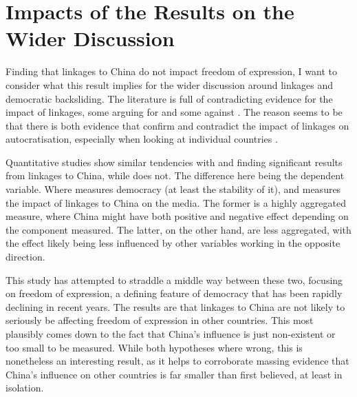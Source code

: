 \section{Impacts of the Results on the Wider Discussion}
Finding that linkages to China do not impact freedom of expression, I want to consider what this result implies for the wider discussion around linkages and democratic backsliding. The literature is full of contradicting evidence for the impact of linkages, some arguing for \citep{gamso_is_2021, loughlin_chinese_2021, toettoe_foreign_2023, yilmaz_authoritarian_2020} and some against \citep{brownlee_limited_2017, wong_chinese_2019}. The reason seems to be that there is both evidence that confirm and contradict the impact of linkages on autocratisation, especially when looking at individual countries \citep{loughlin_chinese_2021, yilmaz_authoritarian_2020, wong_chinese_2019}. 

Quantitative studies show similar tendencies with \citet{gamso_is_2021} and \citet{toettoe_foreign_2023} finding significant results from linkages to China, while \citep{bader_china_2015} does not. The difference here being the dependent variable. Where \citet{bader_china_2015} measures democracy (at least the stability of it), \citet{gamso_is_2021} and \citet{toettoe_foreign_2023} measures the impact of linkages to China on the media. The former is a highly aggregated measure, where China might have both positive and negative effect depending on the component measured.  The latter, on the other hand, are less aggregated, with the effect likely being less influenced by other variables working in the opposite direction.

This study has attempted to straddle a middle way between these two, focusing on freedom of expression, a defining feature of democracy that has been rapidly declining in recent years. The results are that linkages to China are not likely to seriously be affecting freedom of expression in other countries. This most plausibly comes down to the fact that China's influence is just non-existent or too small to be measured. While both hypotheses where wrong, this is nonetheless an interesting result, as it helps to corroborate massing evidence that China's influence on other countries is far smaller than first believed, at least in isolation.

